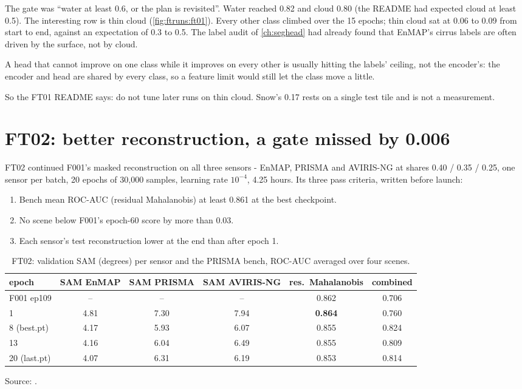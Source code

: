 The gate was ``water at least 0.6, or the plan is revisited''. Water reached 0.82 and cloud 0.80 (the README had
expected cloud at least 0.5). The interesting row is thin cloud (\cref{fig:ftruns:ft01}). Every other class
climbed over the 15 epochs; thin cloud sat at 0.06 to 0.09 from start to end, against an expectation of 0.3 to
0.5. The label audit of \cref{ch:seghead} had already found that EnMAP's cirrus labels are often driven by the
surface, not by cloud.

\begin{keypoint}
A head that cannot improve on one class while it improves on every other is usually hitting the labels' ceiling,
not the encoder's: the encoder and head are shared by every class, so a feature limit would still let the class
move a little.
\end{keypoint}

So the FT01 README says: do not tune later runs on thin cloud. Snow's 0.17 rests on a single test tile and is not a
measurement.

\section{FT02: better reconstruction, a gate missed by 0.006}\label{sec:ftruns:ft02}

FT02 continued F001's masked reconstruction on all three sensors - EnMAP, PRISMA and AVIRIS-NG at shares 0.40 /
0.35 / 0.25, one sensor per batch, 20 epochs of 30,000 samples, learning rate $10^{-4}$, 4.25 hours. Its three
pass criteria, written before launch:
\begin{enumerate}
\item Bench mean ROC-AUC (residual Mahalanobis) at least 0.861 at the best checkpoint.
\item No scene below F001's epoch-60 score by more than 0.03.
\item Each sensor's test reconstruction lower at the end than after epoch 1.
\end{enumerate}

\begin{table}[htbp]
\centering
\caption{FT02: validation SAM (degrees) per sensor and the PRISMA bench, ROC-AUC averaged over four scenes.}
\label{tab:ftruns:ft02}
\small
\setlength{\tabcolsep}{4pt}
\begin{tabular}{lccccc}
\toprule
epoch & SAM EnMAP & SAM PRISMA & SAM AVIRIS-NG & res.\ Mahalanobis & combined \\
\midrule
F001 ep109 & -- & -- & -- & 0.862 & 0.706 \\
1 & 4.81 & 7.30 & 7.94 & \textbf{0.864} & 0.760 \\
8 (best.pt) & 4.17 & 5.93 & 6.07 & 0.855 & 0.824 \\
13 & 4.16 & 6.04 & 6.49 & 0.855 & 0.809 \\
20 (last.pt) & 4.07 & 6.31 & 6.19 & 0.853 & 0.814 \\
\bottomrule
\end{tabular}

\smallskip
{\footnotesize Source: .}
\end{table}

